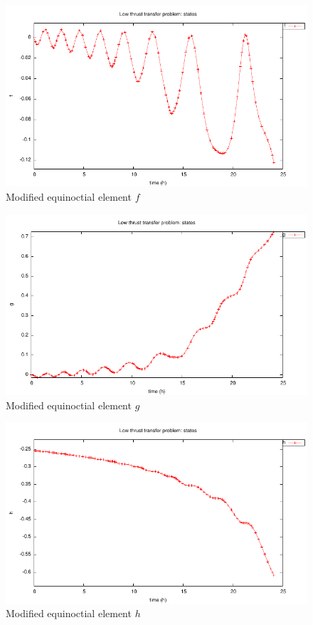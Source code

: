 \documentclass[a4paper,11pt]{report}    %
\begin{document}
\begin{figure}
  \centering 
  \includegraphics{../examples/lowthr/lowthr_x2}
  \caption{Modified equinoctial element $f$}
 \label{fig:lowthr_x2}
\end{figure}

\begin{figure}
  \centering 
  \includegraphics{../examples/lowthr/lowthr_x3}
  \caption{Modified equinoctial element $g$}
 \label{fig:lowthr_x3}
\end{figure}

\begin{figure}
  \centering 
  \includegraphics{../examples/lowthr/lowthr_x4}
  \caption{Modified equinoctial element $h$}
 \label{fig:lowthr_x4}
\end{figure}
\end{document}
